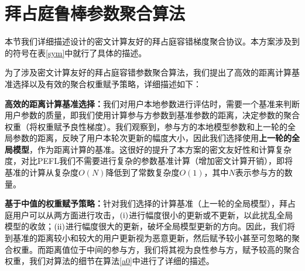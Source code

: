 \section{拜占庭鲁棒参数聚合算法}\label{friendly-alg}
本节我们详细描述设计的密文计算友好的拜占庭容错梯度聚合协议。本方案涉及到的符号在表\ref{sym}中就行了具体的描述。

为了涉及密文计算友好的拜占庭容错参数聚合算法，我们提出了高效的距离计算基准选择以及有效的聚合权重赋予策略，详细描述如下：
\begin{compactitem}
	\item \textbf{高效的距离计算基准选择：}我们对用户本地参数进行评估时，需要一个基准来判断用户参数的质量，即我们使用计算参与方参数到基准参数的距离，决定参数的聚合权重（将权重赋予良性梯度）。我们观察到，参与方的本地模型参数和上一轮的全局参数的距离，反映了用户本轮次更新的幅度大小，因此我们选择使用\textbf{上一轮的全局模型}，作为距离计算的基准。这很好的提升了本方案的密文友好性和计算复杂度，对比PEFL\cite{liu2021privacy}我们不需要进行复杂的参数基准计算（增加密文计算开销），即将基准的计算从复杂度$ O(N) $降低到了常数复杂度$ O(1) $，其中$N$表示参与方的数量。
	\item \textbf{基于中值的权重赋予策略：}针对我们选择的计算基准（上一轮的全局模型），拜占庭用户可以从两方面进行攻击，$(\rm \romannumeral1)$进行幅度很小的更新或不更新，以此扰乱全局模型的收敛；$(\rm \romannumeral2)$进行幅度很大的更新，破坏全局模型更新的方向。因此，我们将到基准的距离较小和较大的用户更新视为恶意更新，然后赋予较小甚至可忽略的聚合权重。而距离值位于中间的参与方，我们将其视为良性参与方，赋予较高的聚合权重，我们对算法的细节在算法\ref{a0}中进行了详细的描述。
\end{compactitem}
